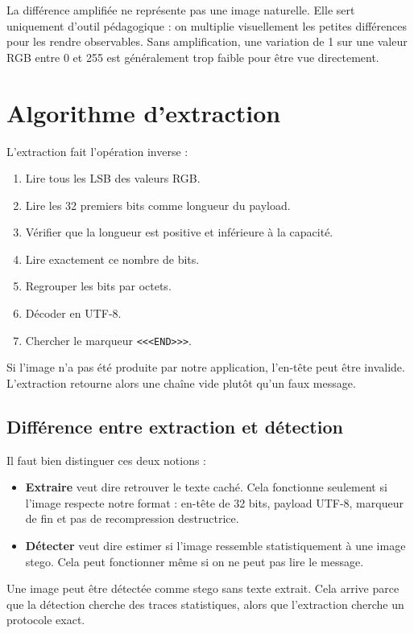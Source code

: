 \documentclass[11pt,a4paper]{article}
\begin{document}
La différence amplifiée ne représente pas une image naturelle. Elle sert uniquement d'outil pédagogique : on multiplie visuellement les petites différences pour les rendre observables. Sans amplification, une variation de 1 sur une valeur RGB entre 0 et 255 est généralement trop faible pour être vue directement.

\section{Algorithme d'extraction}
L'extraction fait l'opération inverse :
\begin{enumerate}
  \item Lire tous les LSB des valeurs RGB.
  \item Lire les 32 premiers bits comme longueur du payload.
  \item Vérifier que la longueur est positive et inférieure à la capacité.
  \item Lire exactement ce nombre de bits.
  \item Regrouper les bits par octets.
  \item Décoder en UTF-8.
  \item Chercher le marqueur \texttt{<<<END>>>}.
\end{enumerate}

Si l'image n'a pas été produite par notre application, l'en-tête peut être invalide. L'extraction retourne alors une chaîne vide plutôt qu'un faux message.

\subsection*{Différence entre extraction et détection}
Il faut bien distinguer ces deux notions :
\begin{itemize}
  \item \textbf{Extraire} veut dire retrouver le texte caché. Cela fonctionne seulement si l'image respecte notre format : en-tête de 32 bits, payload UTF-8, marqueur de fin et pas de recompression destructrice.
  \item \textbf{Détecter} veut dire estimer si l'image ressemble statistiquement à une image stego. Cela peut fonctionner même si on ne peut pas lire le message.
\end{itemize}

Une image peut être détectée comme stego sans texte extrait. Cela arrive parce que la détection cherche des traces statistiques, alors que l'extraction cherche un protocole exact.
\end{document}
